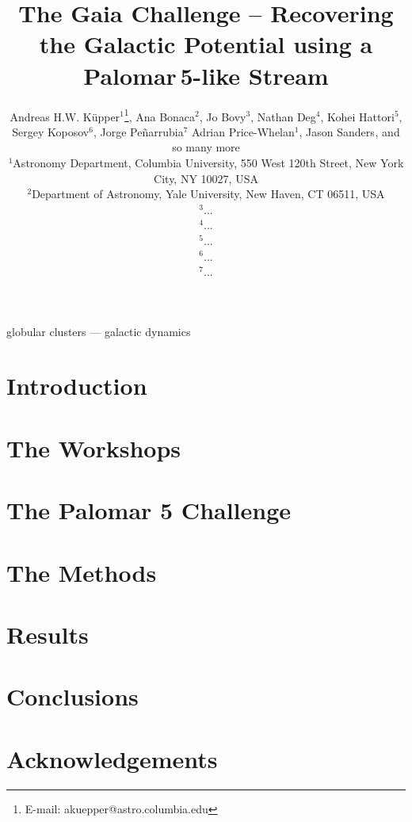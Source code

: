 \documentclass[useAMS,usenatbib]{mn2e}
\title[Gaia Challenge -- Palomar\,5]{The Gaia Challenge -- Recovering the Galactic Potential using a Palomar\,5-like Stream}
\author[K\"upper et al.]
{Andreas H.W. K\"{u}pper$^{1}$\thanks{
E-mail: \mbox{akuepper@astro.columbia.edu}}, Ana Bonaca$^{2}$, Jo Bovy$^{3}$, Nathan Deg$^{4}$, Kohei Hattori$^{5}$, \newauthor
Sergey Koposov$^{6}$, Jorge Pe\~narrubia$^{7}$ Adrian Price-Whelan$^{1}$, Jason Sanders$^{}$,\newauthor
and so many more\\
$^{1}$Astronomy Department, Columbia University, 550 West 120th Street, New York City, NY 10027, USA\\
$^{2}$Department of Astronomy, Yale University, New Haven, CT 06511, USA\\
$^{3}$...\\
$^{4}$...\\
$^{5}$...\\
$^{6}$...\\
$^{7}$...\\
}
\begin{document}


\maketitle

\label{firstpage}

\begin{abstract}

\end{abstract}




\begin{keywords}
globular clusters --- galactic dynamics
\end{keywords}





\section{Introduction}\label{sec:introduction}



\section{The Workshops}\label{sec:workshops}



\section{The Palomar 5 Challenge}\label{sec:challenge}



\section{The Methods}\label{sec:methods}



\section{Results}\label{sec:results}



\section{Conclusions}\label{sec:conclusions}



\section*{Acknowledgements}


\begin{thebibliography}{99}

\end{thebibliography}



\bsp \label{lastpage} 
\end{document}
